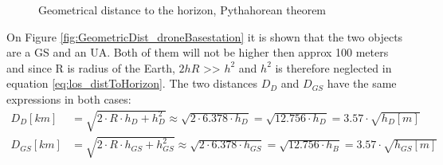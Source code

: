 \begin{figure}[H]
    \hfill
	\hfill
    \hfill
    \caption{Geometrical distance to the horizon, Pythahorean theorem}
\end{figure}

On Figure \ref{fig:GeometricDist_droneBasestation} it is shown that the two objects are a GS and an UA. Both of them will not be higher then approx 100 meters and since R is radius of the Earth, $2hR$ >> $h^2$ and $h^2$ is therefore neglected in equation \ref{eq:los_distToHorizon}. The two distances $D_D$ and $D_{GS}$ have the same expressions in both cases:
\begin{align*}
	D_D [km] &= \sqrt{2\cdot R \cdot h_D + h_{D}^2} \approx \sqrt{2\cdot 6.378\cdot h_D} = \sqrt{12.756\cdot h_D} = 3.57\cdot \sqrt{h_D[m]} \\
	D_{GS} [km] &= \sqrt{2\cdot R \cdot h_{GS} + h_{GS}^2} \approx \sqrt{2\cdot 6.378\cdot h_{GS}} = \sqrt{12.756\cdot h_B} = 3.57\cdot \sqrt{h_{GS}[m]}
\end{align*}

